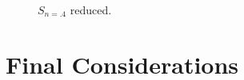 \documentclass[12pt]{article}
\begin{document}
\begin{description}
\begin{figure}[H]
		\captionsetup{justification=centering}
		\caption{$S_{n=.4}$ reduced.}
	\end{figure}
\end{description}

\section{Final Considerations}

\newpage



\end{document}
